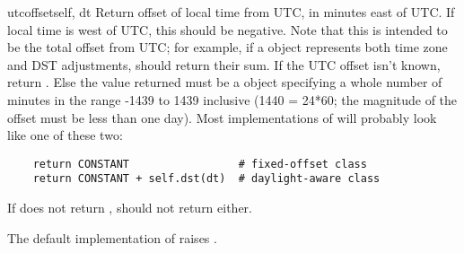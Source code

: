 \begin{methoddesc}[tzinfo]{utcoffset}{self, dt}
  Return offset of local time from UTC, in minutes east of UTC.  If
  local time is west of UTC, this should be negative.  Note that this
  is intended to be the total offset from UTC; for example, if a
   object represents both time zone and DST adjustments,
   should return their sum.  If the UTC offset
  isn't known, return .  Else the value returned must be
  a  object specifying a whole number of minutes in the
  range -1439 to 1439 inclusive (1440 = 24*60; the magnitude of the offset
  must be less than one day).  Most implementations of
   will probably look like one of these two:

\begin{verbatim}
    return CONSTANT                 # fixed-offset class
    return CONSTANT + self.dst(dt)  # daylight-aware class
\end{verbatim}

    If  does not return ,
     should not return  either.

    The default implementation of  raises
    .
\end{methoddesc}

